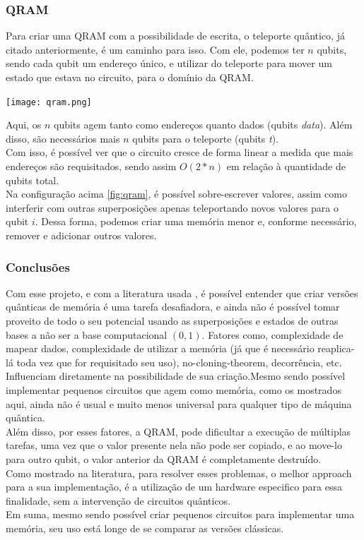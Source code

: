 \documentclass{article}
\begin{document}
\subsubsection{QRAM}
Para criar uma QRAM com a possibilidade de escrita, o teleporte quântico, já citado anteriormente, é um caminho para isso. Com ele, podemos ter $n$ qubits, sendo cada qubit um endereço único, e utilizar do teleporte para mover um estado que estava no circuito, para o domínio da QRAM.

 \begin{center}
 	\texttt{[image: qram.png]}
 	\label{fig:qram}
 \end{center}

Aqui, os $n$ qubits agem tanto como endereços quanto dados (qubits \emph{data}). Além disso, são necessários mais $n$ qubits para o teleporte (qubits \emph{t}).\\
Com isso, é possível ver que o circuito cresce de forma linear a medida que mais endereços são requisitados, sendo assim $O(2*n)$ em relação à quantidade de qubits total.\\
Na configuração acima \ref{fig:qram}, é possível sobre-escrever valores, assim como interferir com outras superposições apenas teleportando novos valores para o qubit $i$. Dessa forma, podemos criar uma memória menor e, conforme necessário, remover e adicionar outros valores.

\subsubsection{Conclusões}
Com esse projeto, e com a literatura usada \cite{jaques2023qram}\cite{Giovannetti_2008}, é possível entender que criar versões quânticas de memória é uma tarefa desafiadora, e ainda não é possível tomar proveito de todo o seu potencial usando as superposições e estados de outras bases a não ser a base computacional $({0,1})$. Fatores como, complexidade de mapear dados, complexidade de utilizar a memória (já que é necessário reaplica-lá toda vez que for requisitado seu uso), no-cloning-theorem, decorrência, etc. Influenciam diretamente na possibilidade de sua criação.Mesmo sendo possível implementar pequenos circuitos que agem como memória, como os mostrados aqui, ainda não é usual e muito menos universal para qualquer tipo de máquina quântica.\\
Além disso, por esses fatores, a QRAM, pode dificultar a execução de múltiplas tarefas, uma vez que o valor presente nela não pode ser copiado, e ao move-lo para outro qubit, o valor anterior da QRAM é completamente destruído.\\
Como mostrado na literatura, para resolver esses problemas, o melhor approach para a sua implementação, é a utilização de um hardware especifico para essa finalidade, sem a intervenção de circuitos quânticos.\\ 
Em suma, mesmo sendo possível criar pequenos circuitos para implementar uma memória, seu uso está longe de se comparar as versões clássicas.
\end{document}
